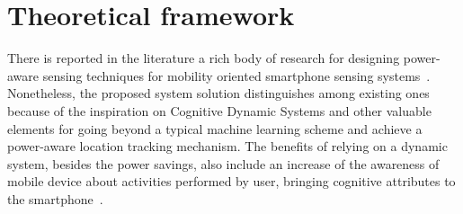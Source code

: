 \documentclass[ENG,PhD]{cinvestav}
\begin{document}
%                                                                                                                                                                             
\section{Theoretical framework}
\label{sec:theoretical-framework} 
There is reported in the literature a rich body of research for designing power-aware sensing techniques for mobility oriented smartphone sensing systems~\cite{Perez-Torres2016}.
Nonetheless, the proposed system solution distinguishes among existing ones because of the inspiration on Cognitive Dynamic Systems and other valuable elements for going beyond a typical machine learning scheme and achieve a power-aware location tracking mechanism.
The benefits of relying on a dynamic system, besides the power savings, also include an increase of the awareness of mobile device about activities performed by user, bringing cognitive attributes to the smartphone~\cite{Campbell2012}.
\end{document}
